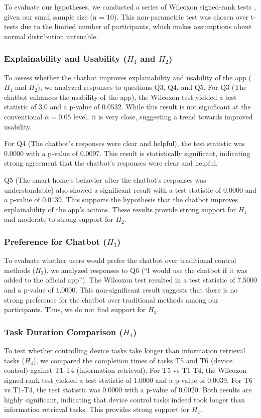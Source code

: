 To evaluate our hypotheses, we conducted a series of Wilcoxon signed-rank tests \cite{sheskin2011handbook}, given our small sample size (n = 10). This non-parametric test was chosen over t-tests due to the limited number of participants, which makes assumptions about normal distribution untenable.
\subsubsection{Explainability and Usability (\(H_1\) and \(H_2\))}
To assess whether the chatbot improves explainability and usability of the app (\(H_1\) and \(H_2\)), we analyzed responses to questions Q3, Q4, and Q5.
For Q3 (The chatbot enhances the usability of the app), the Wilcoxon test yielded a test statistic of 3.0 and a p-value of 0.0532. While this result is not significant at the conventional $\alpha = 0.05$ level, it is very close, suggesting a trend towards improved usability.

For Q4 (The chatbot's responses were clear and helpful), the test statistic was 0.0000 with a p-value of 0.0097. This result is statistically significant, indicating strong agreement that the chatbot's responses were clear and helpful.

Q5 (The smart home's behavior after the chatbot's responses was understandable) also showed a significant result with a test statistic of 0.0000 and a p-value of 0.0139. This supports the hypothesis that the chatbot improves explainability of the app's actions.
These results provide strong support for \(H_1\) and moderate to strong support for \(H_2\).
\subsubsection{Preference for Chatbot (\(H_3\))}
To evaluate whether users would prefer the chatbot over traditional control methods (\(H_3\)), we analyzed responses to Q6 (``I would use the chatbot if it was added to the official app''). The Wilcoxon test resulted in a test statistic of 7.5000 and a p-value of 1.0000. This non-significant result suggests that there is no strong preference for the chatbot over traditional methods among our participants. Thus, we do not find support for \(H_3\).
\subsubsection{Task Duration Comparison (\(H_4\))}
To test whether controlling device tasks take longer than information retrieval tasks (\(H_4\)), we compared the completion times of tasks T5 and T6 (device control) against T1-T4 (information retrieval).
For T5 vs T1-T4, the Wilcoxon signed-rank test yielded a test statistic of 1.0000 and a p-value of 0.0039. For T6 vs T1-T4, the test statistic was 0.0000 with a p-value of 0.0020. Both results are highly significant, indicating that device control tasks indeed took longer than information retrieval tasks. This provides strong support for \(H_4\).
